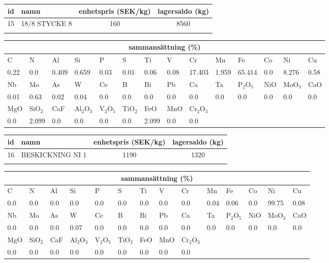 \begin{center}
{\scriptsize\addtolength{\tabcolsep}{-3pt}
\begin{tabular}{clcc}
id&namn&enhetspris (SEK/kg)&lagersaldo (kg)\\
\hline
15&18/8 STYCKE 8&160&8560\\\\
\end{tabular}
\begin{tabular}{llllllllllllll}
\multicolumn{14}{c}{sammansättning (\%)}\\
\hline
C&N&Al&Si&P&S&Ti&V&Cr&Mn&Fe&Co&Ni&Cu\\
\hline
0.22&0.0&0.409&0.659& 0.03&0.01&0.06&0.08& 17.403&1.959&65.414&0.0& 8.276&0.58\\
\hline
Nb&Mo&As&W&Ce&B&Bi&Pb&Ca&Ta&P$_2$O$_5$&NiO&MoO$_3$&CaO\\
\hline
0.01& 0.63& 0.02& 0.04& 0.0& 0.0& 0.0& 0.0& 0.0& 0.0& 0.0& 0.0& 0.0& 0.0\\
\hline
MgO&SiO$_2$&CaF&Al$_2$O$_3$&V$_2$O$_5$&TiO$_2$&FeO&MnO&Cr$_2$O$_3$\\
\hline
0.0& 2.099& 0.0& 0.0& 0.0& 0.0& 2.099& 0.0& 0.0\\
\end{tabular}
}
\end{center}

\begin{center}
{\scriptsize\addtolength{\tabcolsep}{-3pt}
\begin{tabular}{clcc}
id&namn&enhetspris (SEK/kg)&lagersaldo (kg)\\
\hline
16&BESKICKNING NI 1&1190&1320\\\\
\end{tabular}
\begin{tabular}{llllllllllllll}
\multicolumn{14}{c}{sammansättning (\%)}\\
\hline
C&N&Al&Si&P&S&Ti&V&Cr&Mn&Fe&Co&Ni&Cu\\
\hline
0.0&0.0&0.0&0.0& 0.0&0.0&0.0&0.0& 0.0&0.04&0.06&0.0& 99.75&0.08\\
\hline
Nb&Mo&As&W&Ce&B&Bi&Pb&Ca&Ta&P$_2$O$_5$&NiO&MoO$_3$&CaO\\
\hline
0.0& 0.0& 0.0& 0.07& 0.0& 0.0& 0.0& 0.0& 0.0& 0.0& 0.0& 0.0& 0.0& 0.0\\
\hline
MgO&SiO$_2$&CaF&Al$_2$O$_3$&V$_2$O$_5$&TiO$_2$&FeO&MnO&Cr$_2$O$_3$\\
\hline
0.0& 0.0& 0.0& 0.0& 0.0& 0.0& 0.0& 0.0& 0.0\\
\end{tabular}
}
\end{center}


